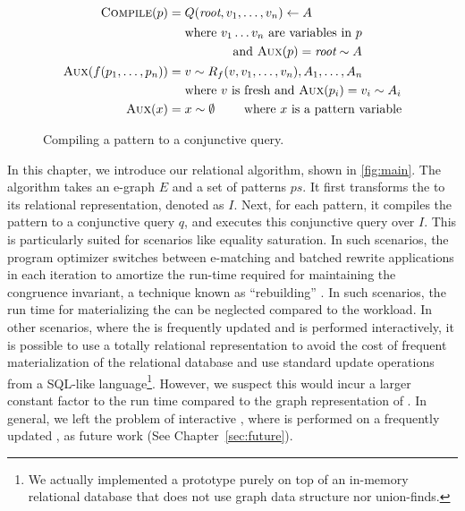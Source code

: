 \def\aux{\textsc{Aux}}
\def\compile{\textsc{Compile}}
\begin{figure}
\begin{align*}
  \compile(p) &= Q(\textit{root}, v_1,\ldots,v_n) \leftarrow A\\
  &\quad \begin{aligned}
  \text{ {where} $v_1\dots v_n$ are variables in $p$}\\
  \text{{ and} $\aux(p)=\textit{root}\sim A$}\\
  \end{aligned}\\
  \aux(f(p_1,\ldots, p_n)) &= v \sim R_f(v, v_1, \ldots, v_n), A_1, \ldots, A_n \\
  & \text{\quad { where} $v$ is fresh and }\aux(p_i) = v_i \sim A_i \\
  \aux(x) &= x \sim \emptyset \text{\qquad { where} $x$ is a pattern variable}\\
\end{align*}
\caption{Compiling a pattern to a conjunctive query.}\label{alg:compile}
\end{figure}
In this chapter, we introduce our relational \ematching algorithm, shown in \autoref{fig:main}. 
The algorithm takes an e-graph $E$ and a set of patterns $\textit{ps}$. 
It first transforms the \egraph to its relational representation, denoted as $I$. 
Next, for each pattern, it compiles the pattern to a conjunctive query $q$, and executes this conjunctive query over $I$. 
This is particularly suited for scenarios like equality saturation. 
In such scenarios, the program optimizer switches between e-matching and batched rewrite applications in each iteration to amortize the run-time required for maintaining the congruence invariant, a technique known as ``rebuilding'' \citep{egg}. 
In such scenarios, the run time for materializing the \egraph can be neglected compared to the \ematching workload.
In other scenarios, where the \egraph is frequently updated and \ematching is performed interactively, it is possible to use a totally relational representation to avoid the cost of frequent materialization of the relational database and use standard update operations from a SQL-like language\footnote{We actually implemented a prototype \egraph purely on top of an in-memory relational database that does not use graph data structure nor union-finds.}.
However, we suspect this would incur a larger constant factor to the run time compared to the graph representation of \egraph.
In general, we left the problem of interactive \ematching, where \ematching is performed on a frequently updated \egraph, as future work (See Chapter~\ref{sec:future}).

